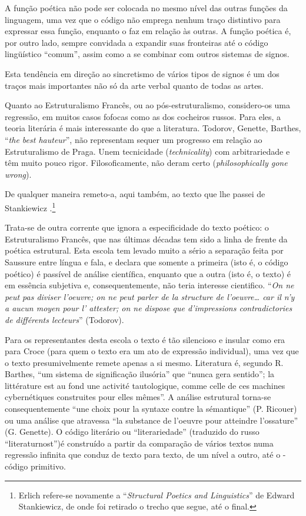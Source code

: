 A função poética não pode ser colocada no mesmo nível das outras funções
da linguagem, uma vez que o código não emprega nenhum traço distintivo
para expressar essa função, enquanto o faz em relação às outras. A
função poética é, por outro lado, sempre convidada a expandir suas
fronteiras até o código lingüístico ``comum'', assim como a se combinar
com outros sistemas de signos.

Esta tendência em direção ao sincretismo de vários tipos de signos é um
dos traços mais importantes não só da arte verbal quanto de todas as
artes.

Quanto ao Estruturalismo Francês, ou ao pós-estruturalismo, considero-os
uma regressão, em muitos casos fofocas como as dos cocheiros russos.
Para eles, a teoria literária é mais interessante do que a literatura.
Todorov, Genette, Barthes, ``\emph{the best hauteur}'', não representam
sequer um progresso em relação ao Estruturalismo de Praga. Unem
tecnicidade (\emph{technicality}) com arbitrariedade e têm muito pouco
rigor. Filosoficamente, não deram certo (\emph{philosophically gone
wrong}).

De qualquer maneira remeto-a, aqui também, ao texto que lhe passei de
Stankiewicz .\footnote{Erlich refere-se novamente a ``\emph{Structural
  Poetics and Linguistics}'' de Edward Stankiewicz, de onde foi retirado
  o trecho que segue, até o final.}

Trata-se de outra corrente que ignora a especificidade do texto poético:
o Estruturalismo Francês, que nas últimas décadas tem sido a linha de
frente da poética estrutural. Esta escola tem levado muito a sério a
separação feita por Saussure entre língua e fala, e declara que somente
a primeira (isto é, o código poético) é passível de análise científica,
enquanto que a outra (isto é, o texto) é em essência subjetiva e,
consequentemente, não teria interesse cientifico. ``\emph{On ne peut pas
diviser l'oeuvre; on ne peut parler de la structure de l'oeuvre\ldots{}
car il n'y a aucun moyen pour l' attester; on ne dispose que
d'impressions contradictories de différents lecteurs}'' (Todorov).

Para os representantes desta escola o texto é tão silencioso e insular
como era para Croce (para quem o texto era um ato de expressão
individual), uma vez que o texto presumivelmente remete apenas a si
mesmo. Literatura é, segundo R. Barthes, ``um sistema de significação
ilusória'' que ``nunca gera sentido''; la littérature est au fond une
activité tautologique, comme celle de ces machines cybernétiques
construites pour elles mêmes''. A análise estrutural torna-se
consequentemente ``une choix pour la syntaxe contre la sémantique'' (P.
Ricouer) ou uma análise que atravessa ``la substance de l'oeuvre pour
atteindre l'ossature'' (G. Genette). O código literário ou
``literariedade'' (traduzido do russo ``literaturnost'')é construído a
partir da comparação de vários textos numa regressão infinita que conduz
de texto para texto, de um nível a outro, até o -código primitivo.

